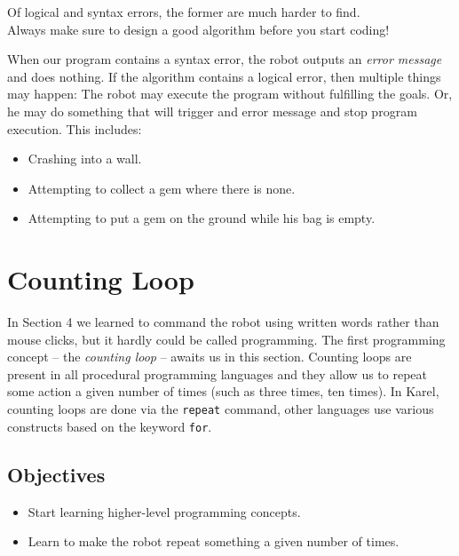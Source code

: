 \begin{gbox}
\begin{center}
Of logical and syntax errors, the former are much harder to find.\\
Always make sure to design a good algorithm before you start coding!
\end{center}
\end{gbox}
\vspace{4mm}

\noindent
When our program contains a syntax error,
the robot outputs an {\em error message} and does nothing.
If the algorithm contains a logical error, then multiple 
things may happen: The robot may execute the program 
without fulfilling the goals. Or, he may do something 
that will trigger and error message and stop program 
execution. This includes:

\begin{itemize}
\item Crashing into a wall.
\item Attempting to collect a gem where there is none.
\item Attempting to put a gem on the ground while his bag is empty.
\end{itemize}


\section{Counting Loop} \label{sec:repeat}

In Section 4 we learned to command the robot using written words rather than mouse 
clicks, but it hardly could be called programming. The first programming concept -- 
the {\em counting loop} -- awaits us in this section. Counting loops 
are present in all procedural programming languages and they
allow us to repeat some action a given number of times (such 
as three times, ten times). In Karel, counting 
loops are done via the {\tt repeat} command, other languages
use various constructs based on the keyword {\tt for}.  

\subsection{Objectives} 

\begin{itemize}
\item Start learning higher-level programming concepts.
\item Learn to make the robot repeat something a given number of times.
\end{itemize}

